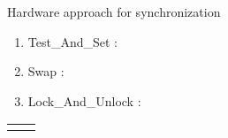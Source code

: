 \begin{enumerate}
 \begin{minipage}{\linewidth}
  \item Hardware approach for synchronization
    \begin{enumerate}
      \item Test\_And\_Set :
      \item Swap :
      \item Lock\_And\_Unlock :
    \end{enumerate}
      \begin{myTableStyle}
        \begin{tabular}{ |m{6cm}|m{5cm}| } \hline
               &
              \\ \hline
               &
              \\ \hline
        \end{tabular}
      \end{myTableStyle}
      \vspace{0.08in}
  \end{minipage}
  \vspace{0.08in}




\end{enumerate}








